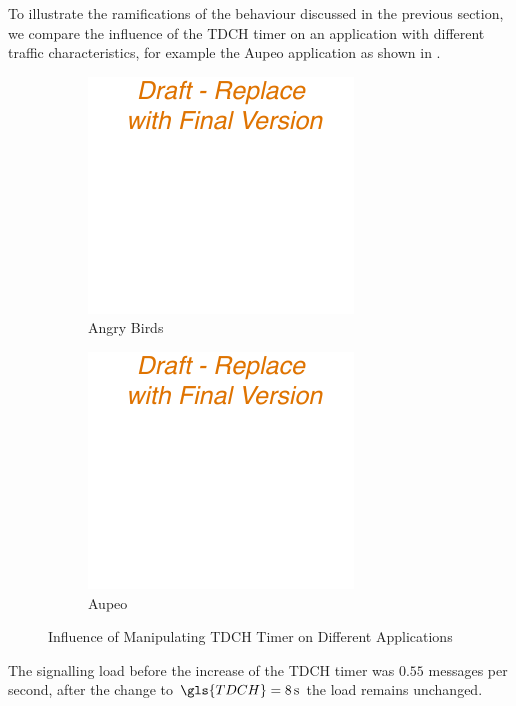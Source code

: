 To illustrate the ramifications of the behaviour discussed in the previous section, we compare the influence of the \gls{TDCH} timer on an application with different traffic characteristics, for example the Aupeo application as shown in .
\begin{figure}
	\begin{subfigure}[b]{.5\textwidth}
	\centering
	\includegraphics{network/network_traces/numerical_results/figures/consequences_angry_birds}
	\caption{Angry Birds}\label{fig:network:network_traces:numerical_results:consequences:angry_birds}
	\end{subfigure} 
	\begin{subfigure}[b]{.5\textwidth}
	\centering
	\includegraphics{network/network_traces/numerical_results/figures/consequences_angry_birds}
	\caption{Aupeo}\label{fig:network:network_traces:numerical_results:consequences:aupeo}
	\end{subfigure}

	\caption{Influence of Manipulating \gls{TDCH} Timer on Different Applications}\label{fig:network:network_traces:numerical_results:consequences}
\end{figure}
The signalling load before the increase of the \gls{TDCH} timer was \(0.55\) messages per second, after the change to \(\gls{TDCH} = \SI{8}{\second}\) the load remains unchanged.
